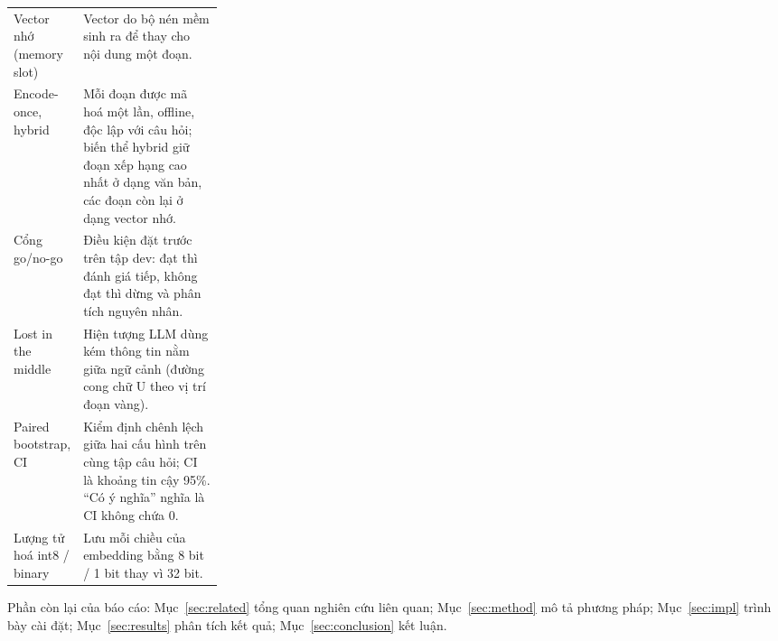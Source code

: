 \begin{table}[!ht]
\begin{tabularx}{\linewidth}{@{}>{\raggedright\arraybackslash}p{0.27\linewidth} X@{}}
Vector nhớ (memory slot) & Vector do bộ nén mềm sinh ra để thay cho nội dung một đoạn. \\
Encode-once, hybrid & Mỗi đoạn được mã hoá một lần, offline, độc lập với câu hỏi; biến thể hybrid
  giữ đoạn xếp hạng cao nhất ở dạng văn bản, các đoạn còn lại ở dạng vector nhớ. \\
Cổng go/no-go & Điều kiện đặt trước trên tập dev: đạt thì đánh giá tiếp, không đạt thì dừng và
  phân tích nguyên nhân. \\
Lost in the middle & Hiện tượng LLM dùng kém thông tin nằm giữa ngữ cảnh (đường cong chữ U theo vị
  trí đoạn vàng). \\
Paired bootstrap, CI & Kiểm định chênh lệch giữa hai cấu hình trên cùng tập câu hỏi; CI là khoảng tin
  cậy 95\%. ``Có ý nghĩa'' nghĩa là CI không chứa 0. \\
Lượng tử hoá int8 / binary & Lưu mỗi chiều của embedding bằng 8 bit / 1 bit thay vì 32 bit. \\
\bottomrule
\end{tabularx}
\end{table}

Phần còn lại của báo cáo: Mục~\ref{sec:related} tổng quan nghiên cứu liên quan; Mục~\ref{sec:method}
mô tả phương pháp; Mục~\ref{sec:impl} trình bày cài đặt; Mục~\ref{sec:results} phân tích kết quả;
Mục~\ref{sec:conclusion} kết luận.

